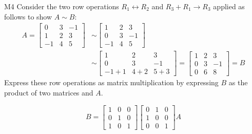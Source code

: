 \begin{problem}{M4}
Consider the two row operations 
\(R_1\leftrightarrow R_2\) and \(R_3+R_1\to R_3\)
applied as follows to show \(A\sim B\):
\begin{align*}
A
  =
\begin{bmatrix}
0&3&-1\\
1&2&3\\
-1&4&5
\end{bmatrix}
  &\sim
\begin{bmatrix}
1&2&3\\
0&3&-1\\
-1&4&5
\end{bmatrix}
  \\&\sim
\begin{bmatrix}
1&2&3\\
0&3&-1\\
-1+1&4+2&5+3
\end{bmatrix}
  =
\begin{bmatrix}
1&2&3\\
0&3&-1\\
0&6&8
\end{bmatrix}
  = 
B
\end{align*}
Express these row operations as matrix multiplication
by expressing \(B\) as the product of two matrices and \(A\).
\end{problem}
\begin{solution}
\[
B
  =
\begin{bmatrix}
  1&0&0\\
  0&1&0\\
  1&0&1
\end{bmatrix}
\begin{bmatrix}
  0&1&0\\
  1&0&0\\
  0&0&1
\end{bmatrix}
A
\]
\end{solution}


